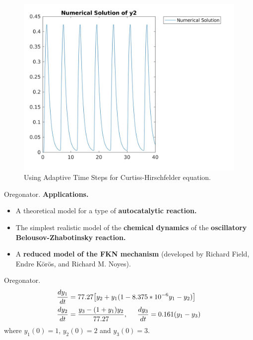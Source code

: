 \documentclass[9pt]{beamer}
\numberwithin{equation}{section}
\begin{document}
\begin{frame}
\begin{figure}
\centering
\includegraphics[scale=0.15]{ats_o2_y2}
\caption{Using Adaptive Time Steps for Curtiss-Hirschfelder equation.}
\end{figure}
\end{frame}

\begin{frame}{Oregonator.}
\textbf{\textsf{Applications.}}
\begin{itemize}
\item A theoretical model for a type of \textbf{autocatalytic reaction.}
\item The simplest realistic model of the \textbf{chemical dynamics} of the \textbf{oscillatory Belousov-Zhabotinsky reaction.}
\item A \textbf{reduced model of the FKN mechanism} (developed by Richard Field, Endre K\"{o}r\"{o}s, and Richard M. Noyes).
\end{itemize}
\begin{block}{Oregonator.}
\begin{subequations}
\begin{align}
    \frac{dy_1}{dt}  &=  77.27 \big[y_2  +  y_1 (1 - 8.375*10^{-6} y_1 - y_2) \big]
    \\
    \frac{dy_2}{dt}  &=  \frac{y_3 - (1+y_1)y_2}{77.27}
    , \hspace{0.5cm}
    \frac{dy_3}{dt}  =  0.161(y_1-y_3)
\end{align}
\end{subequations}
where $y_1(0) = 1$, $y_2(0) = 2$ and $y_3(0) = 3$.
%
\end{block}
\end{frame}
\end{document}
